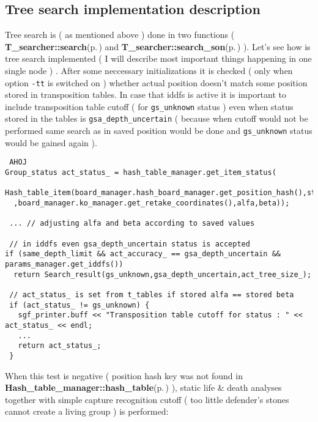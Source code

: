 \subsection{Tree search implementation description}\label{page_3_page_3__sec_1}
Tree search is ( as mentioned above ) done in two functions ( {\bf T\_\-searcher::search}{\rm (p.\,\pageref{classT__searcher_a0})} and {\bf T\_\-searcher::search\_\-son}{\rm (p.\,\pageref{classT__searcher_a11})} ). Let's see how is tree search implemented ( I will describe most important things happening in one single node ) . After some neccessary initializations it is checked ( only when option {\tt -tt} is switched on ) whether actual position doesn't match some position stored in transposition tables. In case that iddfs is active it is important to include transposition table cutoff ( for {\tt gs\_\-unknown} status ) even when status stored in the tables is {\tt gsa\_\-depth\_\-uncertain} ( because when cutoff would not be performed same search as in saved position would be done and {\tt gs\_\-unknown} status would be gained again ).



\footnotesize\begin{verbatim} AHOJ
Group_status act_status_ = hash_table_manager.get_item_status( 
 Hash_table_item(board_manager.hash_board_manager.get_position_hash(),stone_color_to_move_
  ,board_manager.ko_manager.get_retake_coordinates(),alfa,beta));
        
 ... // adjusting alfa and beta according to saved values                                                                 
  
 // in iddfs even gsa_depth_uncertain status is accepted
if (same_depth_limit && act_accuracy_ == gsa_depth_uncertain && params_manager.get_iddfs()) 
  return Search_result(gs_unknown,gsa_depth_uncertain,act_tree_size_); 

 // act_status_ is set from t_tables if stored alfa == stored beta  
 if (act_status_ != gs_unknown) { 
   sgf_printer.buff << "Transposition table cutoff for status : " << act_status_ << endl;
   ...
   return act_status_;
 }
\end{verbatim}
\normalsize
 When this test is negative ( position hash key was not found in {\bf Hash\_\-table\_\-manager::hash\_\-table}{\rm (p.\,\pageref{classHash__table__manager_r1})} ), static life \& death analyses together with simple capture recognition cutoff ( too little defender's stones cannot create a living group ) is performed: 

